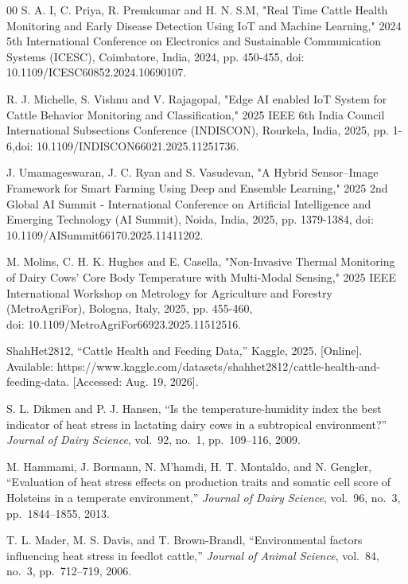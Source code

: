 \documentclass[conference]{IEEEtran}
\begin{document}
\begin{thebibliography}{00}
	S. A. I, C. Priya, R. Premkumar and H. N. S.M, "Real Time Cattle Health Monitoring and Early Disease Detection Using IoT and Machine Learning," 2024 5th International Conference on Electronics and Sustainable Communication Systems (ICESC), Coimbatore, India, 2024, pp. 450-455, doi: 10.1109/ICESC60852.2024.10690107.
	
	R. J. Michelle, S. Vishnu and V. Rajagopal, "Edge AI enabled IoT System for Cattle Behavior Monitoring and Classification," 2025 IEEE 6th India Council International Subsections Conference (INDISCON), Rourkela, India, 2025, pp. 1-6,doi: 10.1109/INDISCON66021.2025.11251736.
	
	J. Umamageswaran, J. C. Ryan and S. Vasudevan, "A Hybrid Sensor–Image Framework for Smart Farming Using Deep and Ensemble Learning," 2025 2nd Global AI Summit - International Conference on Artificial Intelligence and Emerging Technology (AI Summit), Noida, India, 2025, pp. 1379-1384, doi: 10.1109/AISummit66170.2025.11411202.
	
	M. Molins, C. H. K. Hughes and E. Casella, "Non-Invasive Thermal Monitoring of Dairy Cows’ Core Body Temperature with Multi-Modal Sensing," 2025 IEEE International Workshop on Metrology for Agriculture and Forestry (MetroAgriFor), Bologna, Italy, 2025, pp. 455-460,\\
	doi: 10.1109/MetroAgriFor66923.2025.11512516.
	
	 ShahHet2812, ``Cattle Health and Feeding Data,'' Kaggle, 2025. [Online]. Available: https://www.kaggle.com/datasets/shahhet2812/cattle-health-and-feeding-data. [Accessed: Aug. 19, 2026].

	 S. L. Dikmen and P. J. Hansen, ``Is the temperature-humidity index the best indicator of heat stress in lactating dairy cows in a subtropical environment?'' \textit{Journal of Dairy Science}, vol.~92, no.~1, pp.~109--116, 2009.

	 M. Hammami, J. Bormann, N. M'hamdi, H. T. Montaldo, and N. Gengler, ``Evaluation of heat stress effects on production traits and somatic cell score of Holsteins in a temperate environment,'' \textit{Journal of Dairy Science}, vol.~96, no.~3, pp.~1844--1855, 2013.

	 T. L. Mader, M. S. Davis, and T. Brown-Brandl, ``Environmental factors influencing heat stress in feedlot cattle,'' \textit{Journal of Animal Science}, vol.~84, no.~3, pp.~712--719, 2006.
	\end{thebibliography}
	
\end{document}
